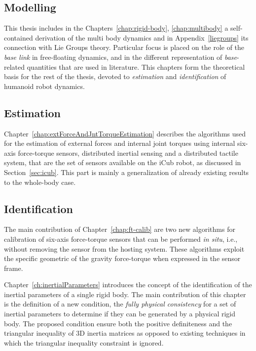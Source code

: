 \subsection{Modelling}
This thesis includes in the Chapters~\ref{chap:rigid-body}, \ref{chap:multibody} a self-contained derivation of the multi body dynamics and in Appendix~\ref{liegroups} its connection with Lie Groups theory. Particular focus is placed on the role of the \emph{base link} in free-floating dynamics, and in the different representation of \emph{base}-related quantities that are used in literature. This chapters form the theoretical basis for the rest of the thesis, devoted to \emph{estimation} and \emph{identification} of humanoid robot dynamics. 

\subsection{Estimation}
Chapter~\ref{chap:extForceAndJntTorqueEstimation} describes the algorithms used for the estimation of external forces and internal joint torques using internal six-axis force-torque sensors, distributed inertial sensing and a distributed tactile system, that are the set of sensors available on the iCub robot, as discussed in Section~\ref{sec:icub}. This 
part is mainly a generalization of already existing results \citep{fuma2010,ivaldi2011,Fumagalli2012,DelPrete2012} to the whole-body case.

\subsection{Identification}
The main contribution of Chapter~\ref{chap:ft-calib} are two new algorithms for calibration of six-axis force-torque sensors that can be performed \emph{in situ}, i.e., without removing the sensor from the hosting  system. These algorithms exploit the specific geometric of the gravity force-torque when expressed in the sensor frame. 

Chapter~\ref{ch:inertialParameters} introduces the concept of the identification of the inertial parameters of a single rigid body.
The main contribution of  this chapter is the definition of a new condition, the \emph{fully physical consistency} for a set of inertial parameters to determine if they can be generated by a physical rigid body. The proposed condition ensure both the positive definiteness and the triangular inequality of 3D inertia matrices as opposed to existing techniques in which the triangular inequality constraint is ignored.

